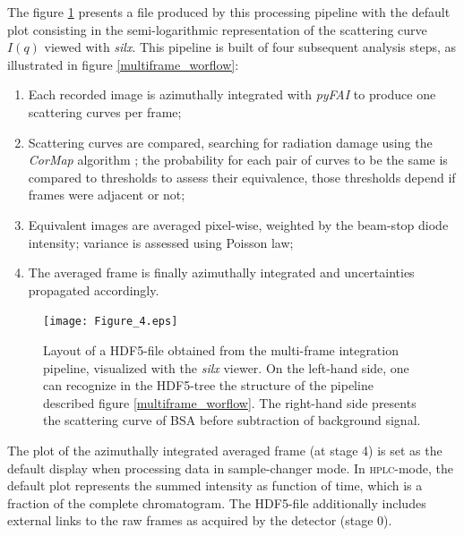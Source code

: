 \documentclass[preprint]{iucr}              %
\begin{document}
The figure \ref{multiframe} presents a file produced by this processing pipeline with the default plot consisting in the semi-logarithmic representation of the scattering curve $I(q)$ viewed with \textit{silx}.
This pipeline is built of four subsequent analysis steps, as illustrated in figure \ref{multiframe_worflow}:
\begin{enumerate}
\item Each recorded image is azimuthally integrated with \textit{pyFAI} \cite{pyfai_2020} to produce one scattering curves per frame;
\item Scattering curves are compared, searching for radiation damage using the \textit{CorMap} algorithm \cite{CorMap}; the probability for each pair of curves to be the same is compared to thresholds to assess their equivalence, those thresholds depend if frames were adjacent or not;
\item Equivalent images are averaged pixel-wise, weighted by the beam-stop diode intensity; variance is assessed using Poisson law;
\item The averaged frame is finally azimuthally integrated and uncertainties propagated accordingly. 
\end{enumerate}

\begin{figure}
     \caption{Layout of a HDF5-file obtained from the multi-frame integration pipeline, visualized with the \textit{silx} viewer.
     On the left-hand side, one can recognize in the HDF5-tree the structure of the pipeline described figure \ref{multiframe_worflow}.
     The right-hand side presents the scattering curve of BSA before subtraction of background signal.}
     \texttt{[image: Figure\_4.eps]}
     \label{multiframe}
\end{figure}

The plot of the azimuthally integrated averaged frame (at stage 4) is set as the default display  when processing data in sample-changer mode.
In \textsc{hplc}-mode, the default plot represents the summed intensity as function of time, which is a fraction of the complete chromatogram. 
The HDF5-file additionally includes external links to the raw frames as acquired by the detector (stage 0).
\end{document}
